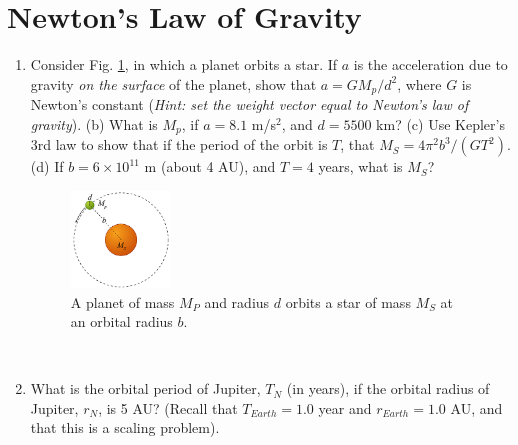 \documentclass[10pt]{article}
\begin{document}
\section{Newton's Law of Gravity}
\begin{enumerate}
\item Consider Fig. \ref{fig:planet}, in which a planet orbits a star.  If $a$ is the acceleration due to gravity \textit{on the surface} of the planet, show that $a = GM_p/d^2$, where $G$ is Newton's constant (\textit{Hint: set the weight vector equal to Newton's law of gravity}).  (b)  What is $M_p$, if $a=8.1$ m/s$^2$, and $d = 5500$ km? (c) Use Kepler's 3rd law to show that if the period of the orbit is $T$, that $M_S = 4\pi^2 b^3/(GT^2)$. (d) If $b = 6 \times 10^{11}$ m (about 4 AU), and $T = 4$ years, what is $M_S$? \\ \vspace{2cm}
\begin{figure}[hb]
\centering
\includegraphics[width=0.25\textwidth]{figures/planet.png}
\caption{\label{fig:planet} A planet of mass $M_P$ and radius $d$ orbits a star of mass $M_S$ at an orbital radius $b$.}
\end{figure} \\ \vspace{0.5cm}
\item What is the orbital period of Jupiter, $T_N$ (in years), if the orbital radius of Jupiter, $r_N$, is 5 AU? (Recall that $T_{Earth} = 1.0$ year and $r_{Earth} = 1.0$ AU, and that this is a scaling problem). \\ \vspace{1cm}
\end{enumerate}
\end{document}
